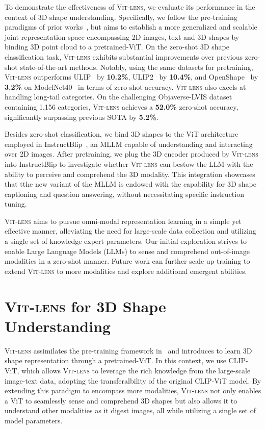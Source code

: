 \documentclass{article}
\newcommand{\clipvit}{CLIP-ViT\xspace}
\newcommand{\ptvit}{pretrained-ViT\xspace}
\newcommand{\vit}{ViT\xspace}
\newcommand{\methodname}{{\scshape Vit-lens}\xspace}
\begin{document}
To demonstrate the effectiveness of \methodname, we evaluate its performance in the context of 3D shape understanding.
Specifically, we follow the pre-training paradigms of prior works~\cite{xue2023ulip,xue2023ulip2,liu2023openshape}, but aims to establish a more generalized and scalable joint representation space encompassing 2D images, text and 3D shapes by binding 3D point cloud to a \ptvit. 
On the zero-shot 3D shape classification task, \methodname exhibits substantial improvements over previous zero-shot state-of-the-art methods.  Notably, using the same datasets for pretraining, \methodname outperforms ULIP~\cite{xue2023ulip} by \textbf{10.2\%}, ULIP2~\cite{xue2023ulip2} by \textbf{10.4\%}, and OpenShape~\cite{liu2023openshape} by \textbf{3.2\%} on ModelNet40~\cite{wu2015modelnet} in terms of zero-shot accuracy.
\methodname also excels at handling long-tail categories. On the challenging Objaverse-LVIS dataset~\cite{deitke2023objaverse} containing 1,156 categories, \methodname achieves a \textbf{52.0\%} zero-shot accuracy, significantly surpassing previous SOTA by \textbf{5.2\%}.

Besides zero-shot classification, we bind 3D shapes to the \vit architecture employed in InstructBlip~\cite{dai2023instructblip}, an MLLM capable of understanding and interacting over 2D images. After pretraining, we plug the 3D encoder produced by \methodname into InstructBlip to investigate whether \methodname can bestow the LLM with the ability to perceive and comprehend the 3D modality.
This integration showcases that tthe new variant of the MLLM is endowed with the capability for 3D shape captioning and question answering, without necessitating specific instruction tuning.

\methodname aims to pursue omni-modal representation learning in a simple yet effective manner, alleviating the need for large-scale data collection and utilizing a single set of knowledge expert parameters.
Our initial exploration strives to enable Large Language Models (LLMs) to sense and comprehend out-of-image modalities in a zero-shot manner. Future work can further scale up training to extend \methodname to more modalities and explore additional emergent abilities.


\section{\methodname for 3D Shape Understanding}
\methodname assimilates the pre-training framework in~\cite{xue2023ulip,xue2023ulip2,liu2023openshape} and introduces to learn 3D shape representation through a \ptvit. In this context, we use \clipvit, which allows \methodname to leverage the rich knowledge from the large-scale image-text data, adopting the transferalbility of the original \clipvit model. 
By extending this paradigm to encompass more modalities, \methodname not only enables a \vit to seamlessly sense and comprehend 3D shapes but also allows it to understand other modalities as it digest images, all while utilizing a single set of model parameters.
\end{document}
